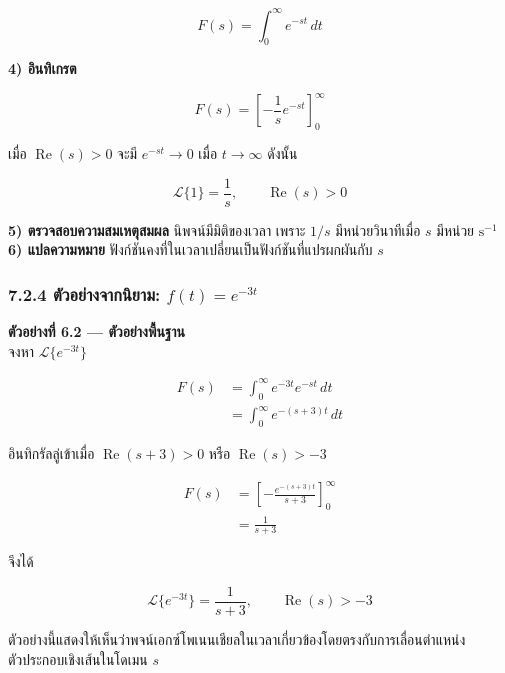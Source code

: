 \[
F(s)=\int_0^{\infty}e^{-st}\,dt
\]

\textbf{4) อินทิเกรต}

\[
F(s)=\left[-\frac{1}{s}e^{-st}\right]_0^{\infty}
\]

เมื่อ $\operatorname{Re}(s)>0$ จะมี $e^{-st}\to 0$ เมื่อ $t\to\infty$ ดังนั้น

\[
\boxed{\mathcal{L}\{1\}=\frac{1}{s}},\qquad \operatorname{Re}(s)>0
\]

\textbf{5) ตรวจสอบความสมเหตุสมผล} นิพจน์มีมิติของเวลา เพราะ $1/s$ มีหน่วยวินาทีเมื่อ $s$ มีหน่วย $\mathrm{s}^{-1}$\\
\textbf{6) แปลความหมาย} ฟังก์ชันคงที่ในเวลาเปลี่ยนเป็นฟังก์ชันที่แปรผกผันกับ $s$

\subsubsection{\texorpdfstring{7.2.4 ตัวอย่างจากนิยาม: $f(t)=e^{-3t}$}{7.2.4 ตัวอย่างจากนิยาม: f(t)=exp(-3t)}}

\textbf{ตัวอย่างที่ 6.2 — ตัวอย่างพื้นฐาน}\\
จงหา $\mathcal{L}\{e^{-3t}\}$

\[
\begin{aligned}
    F(s)&=\int_0^{\infty}e^{-3t}e^{-st}\,dt\\
    &=\int_0^{\infty}e^{-(s+3)t}\,dt
\end{aligned}
\]

อินทิกรัลลู่เข้าเมื่อ $\operatorname{Re}(s+3)>0$ หรือ $\operatorname{Re}(s)>-3$

\[
\begin{aligned}
    F(s)&=\left[-\frac{e^{-(s+3)t}}{s+3}\right]_0^{\infty}\\
    &=\frac{1}{s+3}
\end{aligned}
\]

จึงได้

\[
\boxed{\mathcal{L}\{e^{-3t}\}=\frac{1}{s+3}},\qquad \operatorname{Re}(s)>-3
\]

ตัวอย่างนี้แสดงให้เห็นว่าพจน์เอกซ์โพเนนเชียลในเวลาเกี่ยวข้องโดยตรงกับการเลื่อนตำแหน่งตัวประกอบเชิงเส้นในโดเมน $s$

